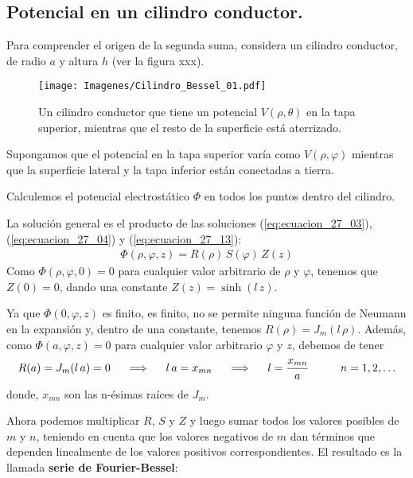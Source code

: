 \documentclass[12pt]{article}
\numberwithin{equation}{section}
\begin{document}
\subsection{Potencial en un cilindro conductor.}

Para comprender el origen de la segunda suma, considera un cilindro conductor, de radio $a$ y altura $h$ (ver la figura xxx).
\begin{figure}[H]
    \centering
    \texttt{[image: Imagenes/Cilindro\_Bessel\_01.pdf]}
    \caption{Un cilindro conductor que tiene un potencial $V (\rho, \theta)$ en la tapa superior, mientras que el resto de la superficie está aterrizado.}
    \label{fig:figura_27_01}
\end{figure}
Supongamos que el potencial en la tapa superior varía como $V (\rho, \varphi)$ mientras que la superficie lateral y la tapa inferior están conectadas a tierra.
\par
Calculemos el potencial electrostático $\Phi$ en todos los puntos dentro del cilindro.
\par
La solución general es el producto de las soluciones (\ref{eq:ecuacion_27_03}), (\ref{eq:ecuacion_27_04}) y (\ref{eq:ecuacion_27_13}):
\begin{align*}
\Phi (\rho, \varphi, z) = R (\rho) \, S (\varphi) \, Z (z)
\end{align*}
Como $\Phi (\rho, \varphi, 0) = 0$ para cualquier valor arbitrario de $\rho$ y $\varphi$, tenemos que $Z (0) = 0$, dando una constante $Z(z) = \sinh (l \, z)$.
\par
Ya que $\Phi (0, \varphi, z)$ es finito, es finito, no se permite ninguna función de Neumann en la expansión y, dentro de una constante, tenemos $R (\rho) = J_{m}(l \, \rho)$. Además, como $\Phi (a, \varphi, z) = 0$ para cualquier valor arbitrario $\varphi$ y $z$, debemos de tener
\begin{align*}
R (a) = J_{m} (l \, a) = 0 \hspace{0.5cm} \Longrightarrow \hspace{0.5cm} l \, a = x_{mn} \hspace{0.5cm} \Longrightarrow \hspace{0.5cm} l = \dfrac{x_{mn}}{a} \hspace{1cm} n = 1, 2, \ldots
\end{align*}
donde, $x_{mn}$ son las n-ésimas raíces de $J_{m}$.
\par
Ahora podemos multiplicar $R$, $S$ y $Z$ y luego sumar todos los valores posibles de $m$ y $n$, teniendo en cuenta que los valores negativos de $m$ dan términos que dependen linealmente de los valores positivos correspondientes. El resultado es la llamada \textbf{serie de Fourier-Bessel}:
\end{document}
